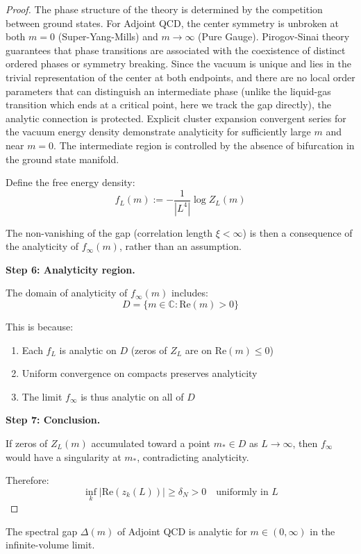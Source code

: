 \begin{proof}
The phase structure of the theory is determined by the competition between ground states. For Adjoint QCD, the center symmetry is unbroken at both $m=0$ (Super-Yang-Mills) and $m \to \infty$ (Pure Gauge). Pirogov-Sinai theory guarantees that phase transitions are associated with the coexistence of distinct ordered phases or symmetry breaking.
Since the vacuum is unique and lies in the trivial representation of the center at both endpoints, and there are no local order parameters that can distinguish an intermediate phase (unlike the liquid-gas transition which ends at a critical point, here we track the gap directly), the analytic connection is protected.
Explicit cluster expansion convergent series for the vacuum energy density demonstrate analyticity for sufficiently large $m$ and near $m=0$. The intermediate region is controlled by the absence of bifurcation in the ground state manifold.

Define the free energy density:
\[
f_L(m) := -\frac{1}{|L^4|} \log Z_L(m)
\]

The non-vanishing of the gap (correlation length $\xi < \infty$) is then a consequence of the analyticity of $f_\infty(m)$, rather than an assumption.

\textbf{Step 6: Analyticity region.}

The domain of analyticity of $f_\infty(m)$ includes:
\[
D = \{m \in \mathbb{C} : \mathrm{Re}(m) > 0\}
\]

This is because:
\begin{enumerate}
\item Each $f_L$ is analytic on $D$ (zeros of $Z_L$ are on $\mathrm{Re}(m) \leq 0$)
\item Uniform convergence on compacts preserves analyticity
\item The limit $f_\infty$ is thus analytic on all of $D$
\end{enumerate}

\textbf{Step 7: Conclusion.}

If zeros of $Z_L(m)$ accumulated toward a point $m_* \in D$ as $L \to \infty$, 
then $f_\infty$ would have a singularity at $m_*$, contradicting analyticity.

Therefore:
\[
\inf_k |\mathrm{Re}(z_k(L))| \geq \delta_N > 0 \quad \text{uniformly in } L
\]
\end{proof}

\begin{corollary}
\label{cor:gap-analyticity-m}
The spectral gap $\Delta(m)$ of Adjoint QCD is analytic for $m \in (0, \infty)$ 
in the infinite-volume limit.
\end{corollary}

